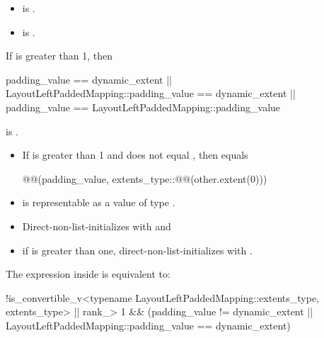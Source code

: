 \begin{itemdescr}
\pnum
\constraints
\begin{itemize}
\item
{}
is .
\item
{}
\newline is .
\end{itemize}

\pnum
\mandates
If  is greater than 1,
then
\begin{codeblock}
padding_value == dynamic_extent ||
LayoutLeftPaddedMapping::padding_value == dynamic_extent ||
padding_value == LayoutLeftPaddedMapping::padding_value
\end{codeblock}
is .

\pnum
\expects
\begin{itemize}
\item
If  is greater than 1 and
 does not equal ,
then  equals
\begin{codeblock}
@@(padding_value,
                        extents_type::@@(other.extent(0)))
\end{codeblock}
\item
{} is representable as
a value of type .
\end{itemize}

\pnum
\effects
\begin{itemize}
\item
Direct-non-list-initializes  with  and
\item
if  is greater than one,
direct-non-list-initializes  with .
\end{itemize}

\pnum
\remarks
The expression inside  is equivalent to:
\begin{codeblock}
!is_convertible_v<typename LayoutLeftPaddedMapping::extents_type, extents_type> ||
rank_> 1 &&
(padding_value != dynamic_extent ||
 LayoutLeftPaddedMapping::padding_value == dynamic_extent)
\end{codeblock}
\end{itemdescr}

